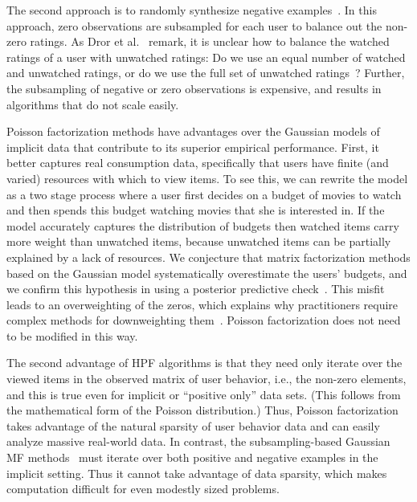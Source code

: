 The second approach is to randomly synthesize negative
examples~\cite{Dror:2012a, Paquet:2013p9197, Gantner:2012p9364}. In
this approach, zero observations are subsampled for each user to
balance out the non-zero ratings. As Dror et al.~\cite{Dror:2012a}
remark, it is unclear how to balance the watched ratings of a user
with unwatched ratings: Do we use an equal number of watched and
unwatched ratings, or do we use the full set of unwatched
ratings~\cite{Cremonesi:2010, Hu:2008p9402}? Further, the subsampling
of negative or zero observations is expensive, and results in
algorithms that do not scale easily.


Poisson factorization methods have advantages over the Gaussian models
of implicit data that contribute to its superior empirical
performance. First, it better captures real consumption data,
specifically that users have finite (and varied) resources with which
to view items.  To see this, we can rewrite the model as a two stage
process where a user first decides on a budget of movies to watch and
then spends this budget watching movies that she is interested in. If
the model accurately captures the distribution of budgets then watched
items carry more weight than unwatched items, because unwatched items
can be partially explained by a lack of resources. We conjecture that
matrix factorization methods based on the Gaussian model
systematically overestimate the users' budgets, and we confirm this
hypothesis in  using a posterior predictive
check~\cite{Gelman:1996}. This misfit leads to an overweighting of the
zeros, which explains why practitioners require complex methods for
downweighting
them~\cite{Hu:2008p9402,Gantner:2012p9364,Dror:2012a,Paquet:2013p9197}.
Poisson factorization does not need to be modified in this way.

The second advantage of HPF algorithms is that they need only iterate
over the viewed items in the observed matrix of user behavior, i.e.,
the non-zero elements, and this is true even for implicit or
``positive only'' data sets.  (This follows from the mathematical form
of the Poisson distribution.)  Thus, Poisson factorization takes
advantage of the natural sparsity of user behavior data and can easily
analyze massive real-world data.  In contrast, the subsampling-based
Gaussian MF methods~\cite{Gantner:2012p9364,
  Dror:2012a,Paquet:2013p9197} must iterate over both positive and
negative examples in the implicit setting. Thus it cannot take
advantage of data sparsity, which makes computation difficult for even
modestly sized problems.

